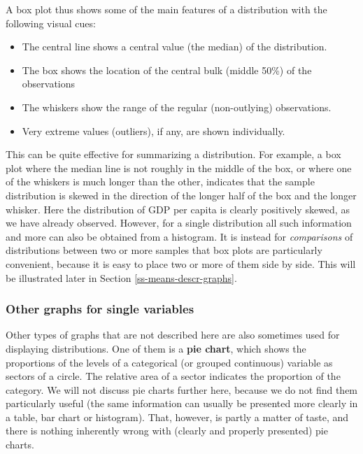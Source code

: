 \documentclass[11pt,a4paper,openany]{book}
\begin{document}
A box plot thus shows some of the main features of a distribution with
the following visual cues:

\begin{itemize}
\item
  The central line shows a central value (the median) of the
  distribution.
\item
  The box shows the location of the central bulk (middle 50\%) of the
  observations
\item
  The whiskers show the range of the regular (non-outlying)
  observations.
\item
  Very extreme values (outliers), if any, are shown individually.
\end{itemize}

This can be quite effective for summarizing a distribution. For example,
a box plot where the median line is not roughly in the middle of the
box, or where one of the whiskers is much longer than the other,
indicates that the sample distribution is skewed in the direction of the
longer half of the box and the longer whisker. Here the distribution of
GDP per capita is clearly positively skewed, as we have already
observed. However, for a single distribution all such information and
more can also be obtained from a histogram. It is instead for
\emph{comparisons} of distributions between two or more samples that box
plots are particularly convenient, because it is easy to place two or
more of them side by side. This will be illustrated later in Section
\ref{ss-means-descr-graphs}.

\subsubsection*{Other graphs for single
variables}\label{other-graphs-for-single-variables}

Other types of graphs that are not described here are also sometimes
used for displaying distributions. One of them is a \textbf{pie chart},
which shows the proportions of the levels of a categorical (or grouped
continuous) variable as sectors of a circle. The relative area of a
sector indicates the proportion of the category. We will not discuss pie
charts further here, because we do not find them particularly useful
(the same information can usually be presented more clearly in a table,
bar chart or histogram). That, however, is partly a matter of taste, and
there is nothing inherently wrong with (clearly and properly presented)
pie charts.
\end{document}

